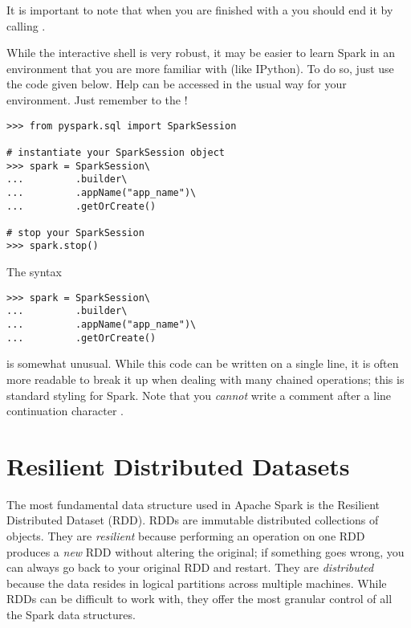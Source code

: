 It is important to note that when you are finished with a  you should end it by calling .

\begin{info}
While the interactive shell is very robust, it may be easier to learn Spark in an environment that you are more familiar with (like IPython). To do so, just use the code given below. Help can be accessed in the usual way for your environment. Just remember to  the !
\end{info}

\begin{lstlisting}
>>> from pyspark.sql import SparkSession

# instantiate your SparkSession object
>>> spark = SparkSession\
...			.builder\
...			.appName("app_name")\
...			.getOrCreate()
		
# stop your SparkSession
>>> spark.stop()
\end{lstlisting}

\begin{info}
The syntax
\begin{lstlisting}
>>> spark = SparkSession\
...			.builder\
...			.appName("app_name")\
...			.getOrCreate()
\end{lstlisting}
is somewhat unusual. While this code can be written on a single line, it is often more readable to break it up when dealing with many chained operations; this is standard styling for Spark. Note that you \textit{cannot} write a comment after a line continuation character .
\end{info}


\section*{Resilient Distributed Datasets} %
The most fundamental data structure used in Apache Spark is the Resilient Distributed Dataset (RDD). 
RDDs are immutable distributed collections of objects. 
They are \textit{resilient} because performing an operation on one RDD produces a \textit{new} RDD without altering the original; if something goes wrong, you can always go back to your original RDD and restart.
They are \textit{distributed} because the data resides in logical partitions across multiple machines.
While RDDs can be difficult to work with, they offer the most granular control of all the Spark data structures.

